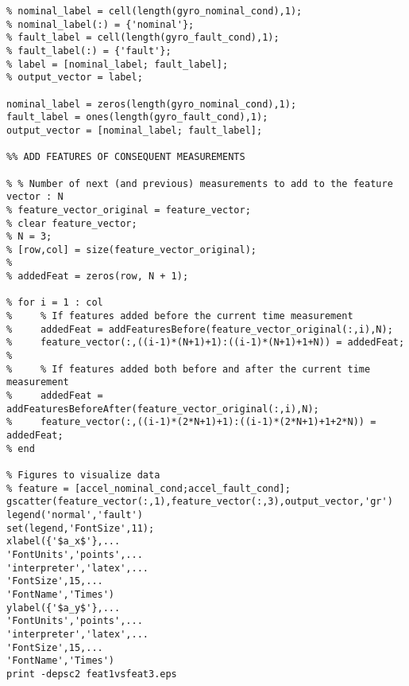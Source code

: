 \begin{lstlisting}
% nominal_label = cell(length(gyro_nominal_cond),1);
% nominal_label(:) = {'nominal'};
% fault_label = cell(length(gyro_fault_cond),1);
% fault_label(:) = {'fault'};
% label = [nominal_label; fault_label];
% output_vector = label;

nominal_label = zeros(length(gyro_nominal_cond),1);
fault_label = ones(length(gyro_fault_cond),1);
output_vector = [nominal_label; fault_label];

%% ADD FEATURES OF CONSEQUENT MEASUREMENTS

% % Number of next (and previous) measurements to add to the feature vector : N
% feature_vector_original = feature_vector;
% clear feature_vector;
% N = 3;
% [row,col] = size(feature_vector_original);
% 
% addedFeat = zeros(row, N + 1);

% for i = 1 : col
%     % If features added before the current time measurement
%     addedFeat = addFeaturesBefore(feature_vector_original(:,i),N);
%     feature_vector(:,((i-1)*(N+1)+1):((i-1)*(N+1)+1+N)) = addedFeat;
%     
%     % If features added both before and after the current time measurement
%     addedFeat = addFeaturesBeforeAfter(feature_vector_original(:,i),N);
%     feature_vector(:,((i-1)*(2*N+1)+1):((i-1)*(2*N+1)+1+2*N)) = addedFeat;
% end

% Figures to visualize data
% feature = [accel_nominal_cond;accel_fault_cond];
gscatter(feature_vector(:,1),feature_vector(:,3),output_vector,'gr')
legend('normal','fault')
set(legend,'FontSize',11);
xlabel({'$a_x$'},...
'FontUnits','points',...
'interpreter','latex',...
'FontSize',15,...
'FontName','Times')
ylabel({'$a_y$'},...
'FontUnits','points',...
'interpreter','latex',...
'FontSize',15,...
'FontName','Times')
print -depsc2 feat1vsfeat3.eps
 \end{lstlisting}
 
